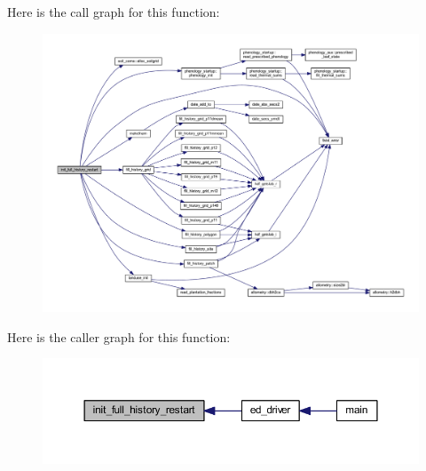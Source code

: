 Here is the call graph for this function\+:\nopagebreak
\begin{figure}[H]
\begin{center}
\leavevmode
\includegraphics[width=350pt]{ed__init__full__history_8_f90_aae7df21bdc388f535c22bf77f8acb93f_cgraph}
\end{center}
\end{figure}




Here is the caller graph for this function\+:\nopagebreak
\begin{figure}[H]
\begin{center}
\leavevmode
\includegraphics[width=350pt]{ed__init__full__history_8_f90_aae7df21bdc388f535c22bf77f8acb93f_icgraph}
\end{center}
\end{figure}


